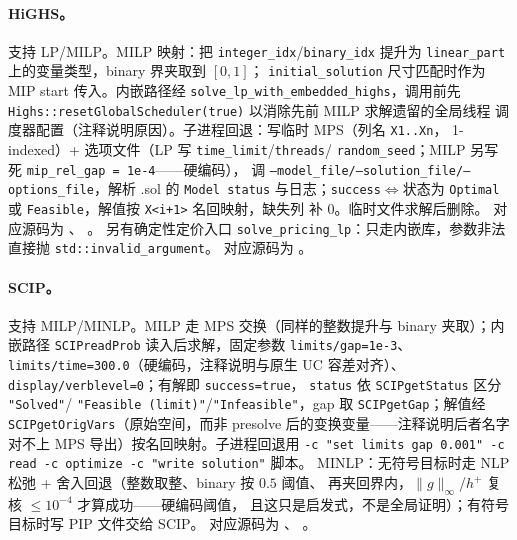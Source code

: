 \paragraph{HiGHS。}
支持 LP/MILP。MILP 映射：把 \texttt{integer\_idx}/\texttt{binary\_idx} 提升为
\texttt{linear\_part} 上的变量类型，binary 界夹取到 $[0,1]$；
\texttt{initial\_solution} 尺寸匹配时作为 MIP start 传入。内嵌路径经
\texttt{solve\_lp\_with\_embedded\_highs}，调用前先
\texttt{Highs::resetGlobalScheduler(true)} 以消除先前 MILP 求解遗留的全局线程
调度器配置（注释说明原因）。子进程回退：写临时 MPS（列名 \texttt{X1..Xn}，
1-indexed）+ 选项文件（LP 写 \texttt{time\_limit}/\texttt{threads}/%
\texttt{random\_seed}；MILP 另写死 \texttt{mip\_rel\_gap = 1e-4}——硬编码），
调 \texttt{--model\_file/--solution\_file/--options\_file}，解析 .sol 的
\texttt{Model status} 与日志；\texttt{success}$\iff$状态为
\texttt{Optimal} 或 \texttt{Feasible}，解值按 \texttt{X<i+1>} 名回映射，缺失列
补 0。临时文件求解后删除。
对应源码为
、
。
另有确定性定价入口 \texttt{solve\_pricing\_lp}：只走内嵌库，参数非法直接抛
\texttt{std::invalid\_argument}。
对应源码为
。

\paragraph{SCIP。}
支持 MILP/MINLP。MILP 走 MPS 交换（同样的整数提升与 binary 夹取）；内嵌路径
\texttt{SCIPreadProb} 读入后求解，固定参数 \texttt{limits/gap=1e-3}、
\texttt{limits/time=300.0}（硬编码，注释说明与原生 UC 容差对齐）、
\texttt{display/verblevel=0}；有解即 \texttt{success=true}，
\texttt{status} 依 \texttt{SCIPgetStatus} 区分 \texttt{"Solved"}/%
\texttt{"Feasible (limit)"}/\texttt{"Infeasible"}，gap 取
\texttt{SCIPgetGap}；解值经 \texttt{SCIPgetOrigVars}（原始空间，而非 presolve
后的变换变量——注释说明后者名字对不上 MPS 导出）按名回映射。子进程回退用
\texttt{-c "set limits gap 0.001" -c read -c optimize -c "write solution"} 脚本。
MINLP：无符号目标时走 NLP 松弛 + 舍入回退（整数取整、binary 按 $0.5$ 阈值、
再夹回界内，$\|g\|_\infty$/$h^+$ 复核 $\le 10^{-4}$ 才算成功——硬编码阈值，
且这只是启发式，不是全局证明）；有符号目标时写 PIP 文件交给 SCIP。
对应源码为
、
。

